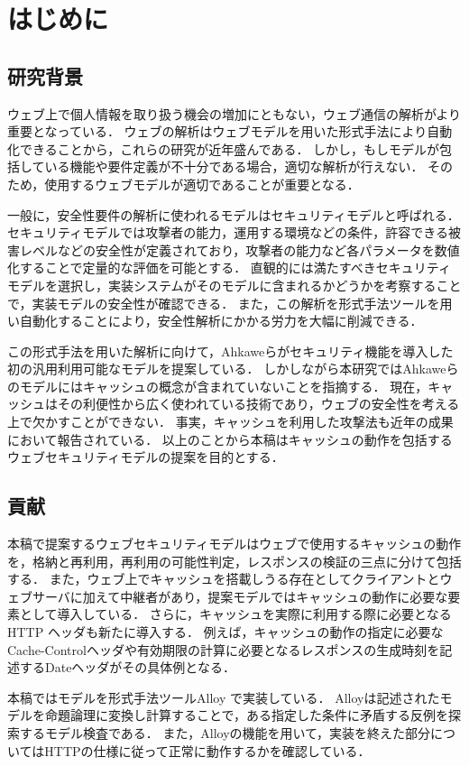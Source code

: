 \documentclass{css}
\begin{document}
\section{はじめに}
\subsection{研究背景}
ウェブ上で個人情報を取り扱う機会の増加にともない，ウェブ通信の解析がより重要となっている．
ウェブの解析はウェブモデルを用いた形式手法により自動化できることから，これらの研究が近年盛んである．
しかし，もしモデルが包括している機能や要件定義が不十分である場合，適切な解析が行えない．
そのため，使用するウェブモデルが適切であることが重要となる．

一般に，安全性要件の解析に使われるモデルはセキュリティモデルと呼ばれる．
セキュリティモデルでは攻撃者の能力，運用する環境などの条件，許容できる被害レベルなどの安全性が定義されており，攻撃者の能力など各パラメータを数値化することで定量的な評価を可能とする．
直観的には満たすべきセキュリティモデルを選択し，実装システムがそのモデルに含まれるかどうかを考察することで，実装モデルの安全性が確認できる．
また，この解析を形式手法ツールを用い自動化することにより，安全性解析にかかる労力を大幅に削減できる．

この形式手法を用いた解析に向けて，Ahkaweら\cite{webmodel}がセキュリティ機能を導入した初の汎用利用可能なモデルを提案している．
しかしながら本研究ではAhkaweらのモデルにはキャッシュの概念が含まれていないことを指摘する．
現在，キャッシュはその利便性から広く使われている技術であり，ウェブの安全性を考える上で欠かすことができない．
事実，キャッシュを利用した攻撃法も近年の成果において報告されている\cite{bcpattack}．
以上のことから本稿はキャッシュの動作を包括するウェブセキュリティモデルの提案を目的とする．

\subsection{貢献}
本稿で提案するウェブセキュリティモデルはウェブで使用するキャッシュの動作を，格納と再利用，再利用の可能性判定，レスポンスの検証の三点に分けて包括する．
また，ウェブ上でキャッシュを搭載しうる存在としてクライアントとウェブサーバに加えて中継者があり，提案モデルではキャッシュの動作に必要な要素として導入している．
さらに，キャッシュを実際に利用する際に必要となるHTTP ヘッダも新たに導入する．
例えば，キャッシュの動作の指定に必要なCache-Controlヘッダや有効期限の計算に必要となるレスポンスの生成時刻を記述するDateヘッダがその具体例となる．

本稿ではモデルを形式手法ツールAlloy で実装している．
Alloyは記述されたモデルを命題論理に変換し計算することで，ある指定した条件に矛盾する反例を探索するモデル検査である．
また，Alloyの機能を用いて，実装を終えた部分についてはHTTPの仕様に従って正常に動作するかを確認している．
\end{document}
